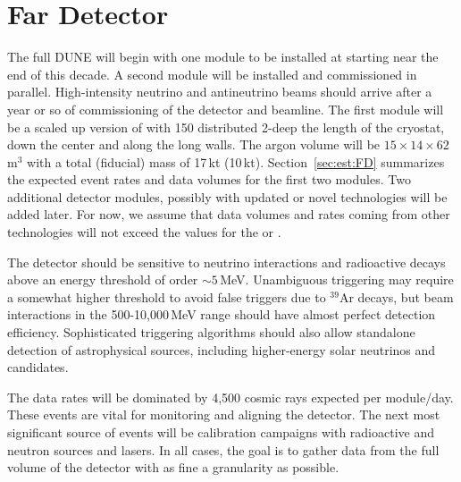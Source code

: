 \documentclass[../main-v1.tex]{subfiles}
\begin{document}
\section{Far Detector %
}
\label{sec:intro-fd}

The full DUNE  will begin with one  module to be installed  at  %
starting near the end of  this decade.  A second  module will be installed and commissioned in parallel.  High-intensity neutrino and antineutrino beams should arrive after a year or so of commissioning of the detector and  beamline.  The first %
module will %
be a scaled up version of  with 150  distributed 2-deep %
the length of the cryostat, down the center and along the long walls. %
The argon volume will be $15\times14\times62$\,m$^3$ with a total (fiducial) mass of 17\,kt (10\,kt).  Section~\ref{sec:est:FD} summarizes the expected event rates and data volumes for the first two modules.  Two additional detector modules, possibly with updated or novel technologies %
will be added later. For now, we assume that data volumes and rates coming from other technologies will not exceed %
the values for the  or .



The detector should be sensitive to neutrino interactions and radioactive decays above an energy threshold of order $\sim 5$\,MeV.  Unambiguous triggering may require a somewhat higher threshold  to avoid false triggers due to $^{39}$Ar decays,  but beam interactions in the 500-10,000\,MeV range should have almost perfect detection efficiency. Sophisticated triggering algorithms should also allow standalone detection of astrophysical sources, including higher-energy solar neutrinos and  candidates. 

The data rates will be dominated by 4,500 cosmic rays expected per module/day.  These events are vital for monitoring and aligning the detector. %
The next most significant source of events will be calibration campaigns with radioactive and neutron sources and lasers.  In all cases, the goal is to gather data from the full volume of the detector with as fine a granularity as possible. 
\end{document}

